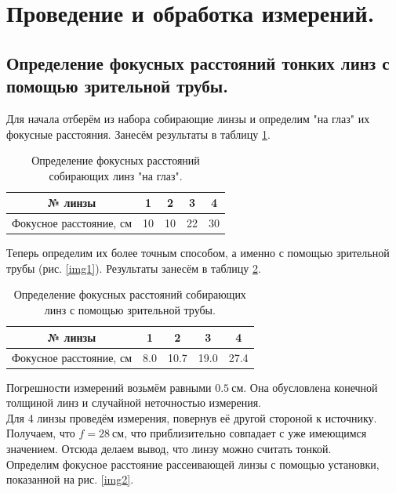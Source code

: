 \documentclass[a4paper, 12pt, twoside]{article}
\begin{document}
\section{Проведение и обработка измерений.} 

\subsection{Определение фокусных расстояний тонких линз с помощью зрительной трубы.}

Для начала отберём из набора собирающие линзы и определим "на глаз" их фокусные расстояния. Занесём результаты в таблицу \ref{t1}.

\begin{table}[H]
	\centering
	\caption{Определение фокусных расстояний собирающих линз "на глаз".}
	\label{t1}
	\begin{tabular}{c|c|c|c|c} \toprule
		№ линзы                 & 1  & 2  & 3  & 4  \\ \midrule
		Фокусное расстояние, см & 10 & 10 & 22 & 30 \\ \bottomrule
	\end{tabular}
\end{table}


Теперь определим их более точным способом, а именно с помощью зрительной трубы (рис. \ref{img1}). Результаты занесём в таблицу \ref{t2}.

\begin{table}[H]
	\centering
	\caption{Определение фокусных расстояний собирающих линз с помощью зрительной трубы.}
	\label{t2}
	\begin{tabular}{c|c|c|c|c} \toprule
		№ линзы                 & 1   & 2    & 3    & 4    \\ \midrule
		Фокусное расстояние, см & 8.0 & 10.7 & 19.0 & 27.4 \\ \bottomrule
	\end{tabular}
\end{table}

Погрешности измерений возьмём равными $0.5~\text{см}$. Она обусловлена конечной толщиной линз и случайной неточностью измерения.\\

Для 4 линзы проведём измерения, повернув её другой стороной к источнику. Получаем, что $f = 28~\text{см}$, что приблизительно совпадает с уже имеющимся значением. Отсюда делаем вывод, что линзу можно считать тонкой.\\ 


Определим фокусное расстояние рассеивающей линзы с помощью установки, показанной на рис. \ref{img2}. 
\end{document}
